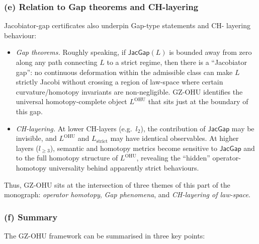 \documentclass[11pt]{book}
\theoremstyle{plain}
\theoremstyle{definition}
\begin{document}
\subsubsection*{(e) Relation to Gap theorems and CH-layering}

Jacobiator-gap certificates also underpin Gap-type statements and CH-
layering behaviour:

\begin{itemize}
  \item \emph{Gap theorems.} Roughly speaking, if
        $\mathsf{JacGap}(L)$ is bounded away from zero along any
        path connecting $L$ to a strict regime, then there is a
        “Jacobiator gap”: no continuous deformation within the
        admissible class can make $L$ strictly Jacobi without crossing
        a region of law-space where certain curvature/homotopy
        invariants are non-negligible. GZ-OHU identifies the
        universal homotopy-complete object $L^{\mathrm{OHU}}$ that
        sits just at the boundary of this gap.
  \item \emph{CH-layering.} At lower CH-layers (e.g.\ $l_2$), the
        contribution of $\mathsf{JacGap}$ may be invisible, and
        $L^{\mathrm{OHU}}$ and $L_{\mathrm{strict}}$ may have identical
        observables. At higher layers ($l_{\ge3}$), semantic and
        homotopy metrics become sensitive to $\mathsf{JacGap}$ and to
        the full homotopy structure of $L^{\mathrm{OHU}}$, revealing
        the “hidden” operator-homotopy universality behind apparently
        strict behaviours.
\end{itemize}

Thus, GZ-OHU sits at the intersection of three themes of this part of
the monograph: \emph{operator homotopy}, \emph{Gap phenomena}, and
\emph{CH-layering of law-space}.

\subsubsection*{(f) Summary}

The GZ-OHU framework can be summarised in three key points:
\end{document}
